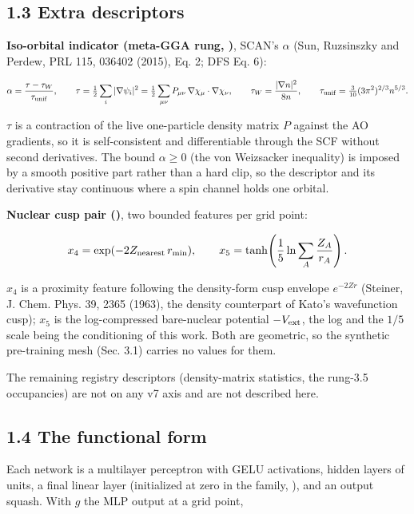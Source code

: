 \documentclass[10pt,a4paper]{article}
\begin{document}
\subsection*{1.3 Extra descriptors}

\textbf{Iso-orbital indicator (meta-GGA rung, )}, SCAN's $\alpha$ (Sun, Ruzsinszky and Perdew, PRL 115, 036402 (2015), Eq. 2; DFS Eq. 6):

\[
\alpha = \frac{\tau - \tau_W}{\tau_{\rm unif}}, \qquad
\tau = \tfrac12 \sum_i |\nabla\psi_i|^2 = \tfrac12 \sum_{\mu\nu} P_{\mu\nu}\, \nabla\chi_\mu\cdot\nabla\chi_\nu, \qquad
\tau_W = \frac{|\nabla n|^2}{8n}, \qquad
\tau_{\rm unif} = \tfrac{3}{10}(3\pi^2)^{2/3} n^{5/3}.
\]

$\tau$ is a contraction of the live one-particle density matrix $P$ against the AO gradients, so it is self-consistent and differentiable through the SCF without second derivatives. The bound $\alpha \ge 0$ (the von Weizsacker inequality) is imposed by a smooth positive part rather than a hard clip, so the descriptor and its derivative stay continuous where a spin channel holds one orbital.

\textbf{Nuclear cusp pair ()}, two bounded features per grid point:

\[
x_4 = \exp(-2 Z_{\rm nearest}\, r_{\min}), \qquad
x_5 = \tanh\!\left(\frac{1}{5}\ln \sum_A \frac{Z_A}{r_A}\right).
\]

$x_4$ is a proximity feature following the density-form cusp envelope $e^{-2Zr}$ (Steiner, J. Chem. Phys. 39, 2365 (1963), the density counterpart of Kato's wavefunction cusp); $x_5$ is the log-compressed bare-nuclear potential $-V_{\rm ext}$, the log and the $1/5$ scale being the conditioning of this work. Both are geometric, so the synthetic pre-training mesh (Sec. 3.1) carries no values for them.

The remaining registry descriptors (density-matrix statistics, the rung-3.5 occupancies) are not on any v7 axis and are not described here.

\subsection*{1.4 The functional form}

Each network is a multilayer perceptron with GELU activations,  hidden layers of  units, a final linear layer (initialized at zero in the  family, ), and an output squash. With $g$ the MLP output at a grid point,
\end{document}
